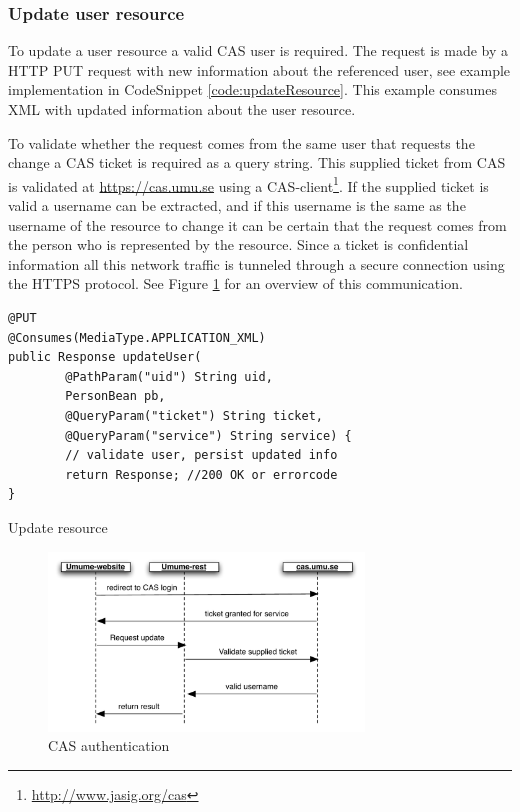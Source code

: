 \documentclass[titlepage, twocolumn, a4paper, 10pt]{article}
\begin{document}
\subsubsection{Update user resource}\label{sec:updateuser}
To update a user resource a valid CAS user is required. The request is
made by a HTTP PUT request with new information about the referenced
user, see example implementation in CodeSnippet
\ref{code:updateResource}. This example consumes XML with updated
information about the user resource.

To validate whether the request comes from the same user that requests
the change a CAS ticket is required as a query string. This supplied
ticket from CAS is validated at \url{https://cas.umu.se} using a
CAS-client\footnote{\url{http://www.jasig.org/cas}}. If the supplied
ticket is valid a username can be extracted, and if this username is
the same as the username of the resource to change it can be certain
that the request comes from the person who is represented by the
resource. Since a ticket is confidential information all this network
traffic is tunneled through a secure connection using the HTTPS
protocol. See Figure \ref{fig:images/auth} for an overview of this
communication.

\begin{code}
  \begin{footnotesize}
\begin{verbatim}
@PUT
@Consumes(MediaType.APPLICATION_XML)
public Response updateUser(
        @PathParam("uid") String uid,
        PersonBean pb,
        @QueryParam("ticket") String ticket,
        @QueryParam("service") String service) {
        // validate user, persist updated info
        return Response; //200 OK or errorcode
}
\end{verbatim}
  \end{footnotesize}
  \caption{Update resource}\label{code:updateResource}
\end{code}

\begin{figure}[!thb]
  \centering
  \includegraphics[width=3.3in]{images/auth.pdf}
  \caption{CAS authentication}
  \label{fig:images/auth}
\end{figure}
\end{document}
